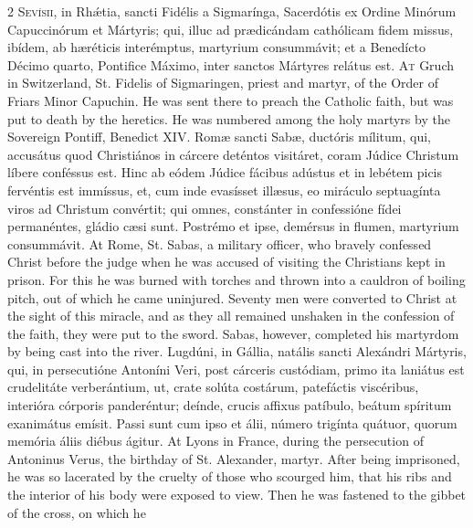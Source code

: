 \begin{paracol}{2}
\lettrine[lines=2]{S}{evísii,} in Rhǽtia, 
 sancti Fidélis a Sigmarínga, Sacerdótis ex Ordine Minórum Capuccinórum et 
 Mártyris; qui, illuc ad prædicándam cathólicam fidem missus, ibídem, ab 
 hæréticis interémptus, martyrium consummávit; et a Benedícto Décimo quarto, 
 Pontifice Máximo, inter sanctos Mártyres relátus est.
\switchcolumn
{}
\lettrine[lines=2]{A}{t} Gruch in Switzerland, St. 
 Fidelis of Sigmaringen, priest and martyr, of the Order of Friars Minor 
 Capuchin. He was sent there to preach the Catholic faith, but was put 
 to death by the heretics. He was numbered among the holy martyrs by 
 the Sovereign Pontiff, Benedict XIV.
\switchcolumn*
{}
Romæ sancti Sabæ, 
 ductóris mílitum, qui, accusátus quod Christiános in cárcere deténtos 
 visitáret, coram Júdice Christum líbere conféssus est. Hinc ab eódem 
 Júdice fácibus adústus et in lebétem picis fervéntis est immíssus, et, cum 
 inde evasísset illæsus, eo miráculo septuagínta viros ad Christum convértit; 
 qui omnes, constánter in confessióne fídei permanéntes, gládio cæsi sunt. 
 Postrémo et ipse, demérsus in flumen, martyrium consummávit.
\switchcolumn
{}
At Rome, St. Sabas, a military 
 officer, who bravely confessed Christ before the judge when he was accused 
 of visiting the Christians kept in prison. For this he was burned with 
 torches and thrown into a cauldron of boiling pitch, out of which he came 
 uninjured. Seventy men were converted to Christ at the sight of this 
 miracle, and as they all remained unshaken in the confession of the faith, 
 they were put to the sword. Sabas, however, completed his martyrdom by 
 being cast into the river.
\switchcolumn*
{}
Lugdúni, in Gállia, 
 natális sancti Alexándri Mártyris, qui, in persecutióne Antoníni Veri, post cárceris custódiam, primo ita laniátus est crudelitáte verberántium, ut, 
 crate solúta costárum, patefáctis viscéribus, interióra córporis panderéntur; 
 deínde, crucis affixus patíbulo, beátum spíritum exanimátus emísit. 
 Passi sunt cum ipso et álii, número trigínta quátuor, quorum memória áliis 
 diébus ágitur.
\switchcolumn
{}
At Lyons in France, during the 
 persecution of Antoninus Verus, the birthday of St. Alexander, martyr. 
 After being imprisoned, he was so lacerated by the cruelty of those who 
 scourged him, that his ribs and the interior of his body were exposed to 
 view. Then he was fastened to the gibbet of the cross, on which he 

\end{paracol}
